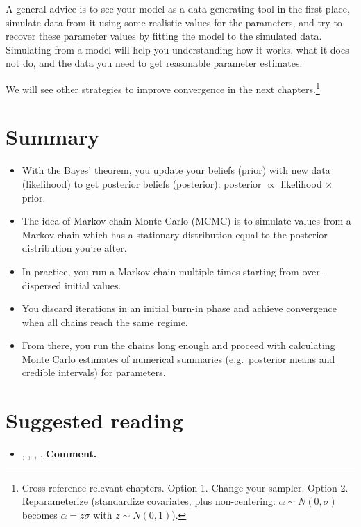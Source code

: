 \documentclass[
  12pt,
]{krantz}
\providecommand{\tightlist}{%
  \setlength{\itemsep}{0pt}\setlength{\parskip}{0pt}}
\begin{document}
A general advice is to see your model as a data generating tool in the first place, simulate data from it using some realistic values for the parameters, and try to recover these parameter values by fitting the model to the simulated data. Simulating from a model will help you understanding how it works, what it does not do, and the data you need to get reasonable parameter estimates.

We will see other strategies to improve convergence in the next chapters.\footnote{Cross reference relevant chapters. Option 1. Change your sampler. Option 2. Reparameterize (standardize covariates, plus non-centering: \(\alpha \sim N(0,\sigma)\) becomes \(\alpha = z \sigma\) with \(z \sim N(0,1)\)).}

\hypertarget{summary}{%
\section{Summary}\label{summary}}

\begin{itemize}
\item
  With the Bayes' theorem, you update your beliefs (prior) with new data (likelihood) to get posterior beliefs (posterior): posterior \(\propto\) likelihood \(\times\) prior.
\item
  The idea of Markov chain Monte Carlo (MCMC) is to simulate values from a Markov chain which has a stationary distribution equal to the posterior distribution you're after.
\item
  In practice, you run a Markov chain multiple times starting from over-dispersed initial values.
\item
  You discard iterations in an initial burn-in phase and achieve convergence when all chains reach the same regime.
\item
  From there, you run the chains long enough and proceed with calculating Monte Carlo estimates of numerical summaries (e.g.~posterior means and credible intervals) for parameters.
\end{itemize}

\hypertarget{suggested-reading}{%
\section{Suggested reading}\label{suggested-reading}}

\begin{itemize}
\tightlist
\item
  \citet{gelmanhill2006}, \citet{gelman2020workflow}, \citet{mccarthy2007}, \citet{mcelreathbook}. \textbf{Comment.}
\end{itemize}
\end{document}
